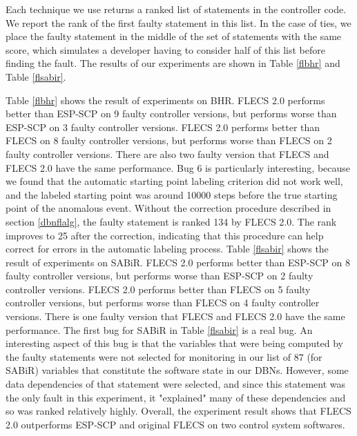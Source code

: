 Each technique we use returns a ranked list of statements in the controller code. We report the rank of the first faulty statement in this list. In the case of ties, we place the faulty statement in the middle of the set of statements with the same score, which simulates a developer having to consider half of this list before finding the fault. The results of our experiments are shown in Table \ref{flbhr} and Table \ref{flsabir}.

Table \ref{flbhr} shows the result of experiments on BHR. FLECS 2.0 performs better than ESP-SCP on 9 faulty controller versions, but performs worse than ESP-SCP on 3 faulty controller versions.  FLECS 2.0 performs better than FLECS on 8 faulty controller versions, but performs worse than FLECS on 2 faulty controller versions. There are also two faulty version that FLECS and FLECS 2.0 have the same performance. Bug 6 is particularly interesting, because we found that the automatic starting point labeling criterion did not work well, and the labeled starting point was around 10000 steps before the true starting point of the anomalous event. Without the correction procedure described in section \ref{dbnflalg}, the faulty statement is ranked 134 by FLECS 2.0. The rank improves to 25 after the correction, indicating that this procedure can help correct for errors in the automatic labeling process. Table \ref{flsabir} shows the result of experiments on SABiR. FLECS 2.0 performs better than ESP-SCP on 8 faulty controller versions, but performs worse than ESP-SCP on 2 faulty controller versions.  FLECS 2.0 performs better than FLECS on 5 faulty controller versions, but performs worse than FLECS on 4 faulty controller versions. There is one faulty version that FLECS and FLECS 2.0 have the same performance. The first bug for SABiR in Table \ref{flsabir} is a real bug.  An interesting aspect of this bug is that the variables that were being computed by the faulty statements were not selected for monitoring in our list of 87 (for SABiR) variables that constitute the software state in our DBNs. However, some data dependencies of that statement were selected, and since this statement was the only fault in this experiment, it "explained" many of these dependencies and so was ranked relatively highly. Overall, the experiment result shows that FLECS 2.0 outperforms ESP-SCP and original FLECS on two control system softwares. 

